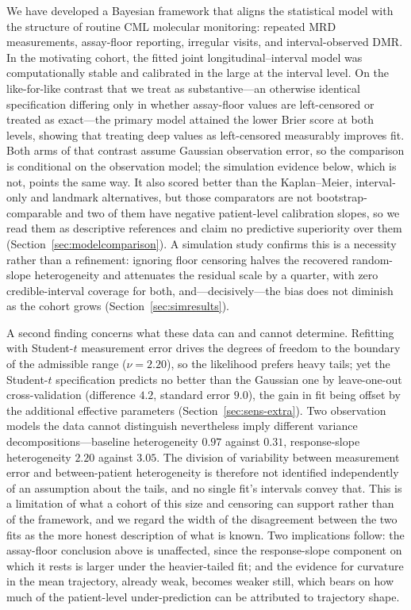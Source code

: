 \documentclass[11pt]{article}
\begin{document}
We have developed a Bayesian framework that aligns the statistical model
with the structure of routine CML molecular monitoring: repeated MRD
measurements, assay-floor reporting, irregular visits, and
interval-observed DMR. In the motivating cohort, the fitted joint
longitudinal--interval model was computationally stable and calibrated in the
large at the interval level. On the like-for-like contrast that we treat as
substantive---an otherwise identical specification differing only in whether
assay-floor values are left-censored or treated as exact---the primary model
attained the lower Brier score at both levels, showing that treating deep values
as left-censored measurably improves fit. Both arms of that contrast assume
Gaussian observation error, so the comparison is conditional on the observation
model; the simulation evidence below, which is not, points the same way. It also scored better than the
Kaplan--Meier, interval-only and landmark alternatives, but those comparators
are not bootstrap-comparable and two of them have negative patient-level
calibration slopes, so we read them as descriptive references and claim no
predictive superiority over them (Section~\ref{sec:modelcomparison}). A simulation study confirms this is a necessity
rather than a refinement: ignoring floor censoring halves the recovered
random-slope heterogeneity and attenuates the residual scale by a quarter, with
zero credible-interval coverage for both, and---decisively---the bias does not
diminish as the cohort grows (Section~\ref{sec:simresults}).

A second finding concerns what these data can and cannot determine. Refitting
with Student-$t$ measurement error drives the degrees of freedom to the boundary
of the admissible range ($\nu=2.20$), so the likelihood prefers heavy tails; yet
the Student-$t$ specification predicts no better than the Gaussian one by
leave-one-out cross-validation (difference $4.2$, standard error $9.0$), the
gain in fit being offset by the additional effective parameters
(Section~\ref{sec:sens-extra}). Two observation models the data cannot
distinguish nevertheless imply different variance decompositions---baseline
heterogeneity $0.97$ against $0.31$, response-slope heterogeneity $2.20$ against
$3.05$. The division of variability between measurement error and between-patient
heterogeneity is therefore not identified independently of an assumption about
the tails, and no single fit's intervals convey that. This is a limitation of
what a cohort of this size and censoring can support rather than of the
framework, and we regard the width of the disagreement between the two fits as
the more honest description of what is known. Two implications follow: the
assay-floor conclusion above is unaffected, since the response-slope component
on which it rests is larger under the heavier-tailed fit; and the evidence for
curvature in the mean trajectory, already weak, becomes weaker still, which
bears on how much of the patient-level under-prediction can be attributed to
trajectory shape.
\end{document}
